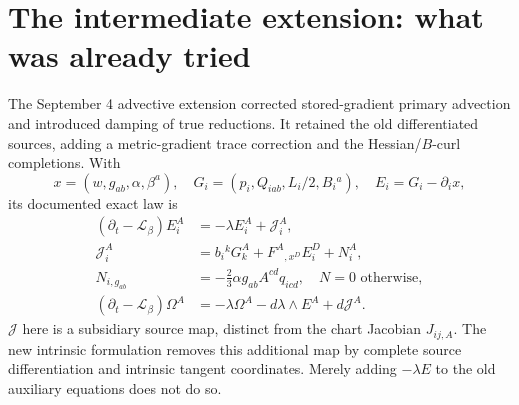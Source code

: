\documentclass[11pt,letterpaper]{article}
\begin{document}
\section{The intermediate extension: what was already tried}
The September 4 advective extension corrected stored-gradient primary advection and introduced damping of true reductions. It retained the old differentiated sources, adding a metric-gradient trace correction and the Hessian/$B$-curl completions. With
\begin{equation}
x=(w,g_{ab},\alpha,\beta^a),\quad G_i=(p_i,Q_{iab},L_i/2,B_i{}^a),\quad E_i=G_i-\partial_ix,
\end{equation}
its documented exact law is
\begin{align}
(\partial_t-\mathcal L_\beta)E_i^A
&=-\lambda E_i^A+\mathcal J_i^A,\\
\mathcal J_i^A&=b_i{}^kG_k^A+F^A{}_{,x^D}E_i^D+N_i^A,\\
N_{i,g_{ab}}&=-\tfrac23\alpha g_{ab}A^{cd}q_{icd},\quad N=0\text{ otherwise},\\
(\partial_t-\mathcal L_\beta)\Omega^A
&=-\lambda\Omega^A-d\lambda\wedge E^A+d\mathcal J^A.
\end{align}
$\mathcal J$ here is a subsidiary source map, distinct from the chart Jacobian $J_{ij,A}$. The new intrinsic formulation removes this additional map by complete source differentiation and intrinsic tangent coordinates. Merely adding $-\lambda E$ to the old auxiliary equations does not do so.
\end{document}

